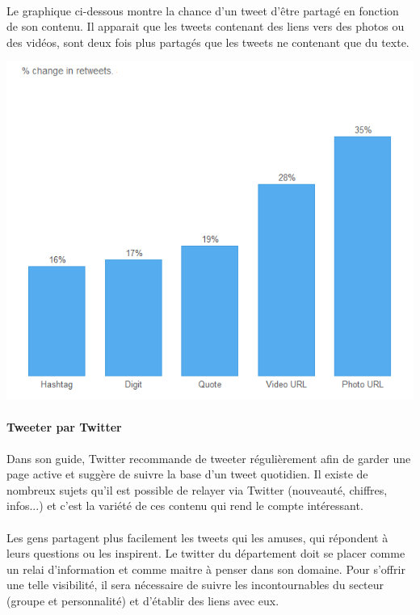 \paragraph{}
Le graphique ci-dessous montre la chance d'un tweet d'être partagé en fonction de son contenu. Il apparait que les tweets contenant des liens vers des photos ou des vidéos, sont deux fois plus partagés que les tweets ne contenant que du texte.
\begin{center}
\includegraphics[scale=0.5]{./image/retweet.png}
\end{center}

\paragraph{Tweeter par Twitter ~~\\} 
Dans son guide, Twitter recommande de tweeter régulièrement afin de garder une page active et suggère de suivre la base d'un tweet quotidien.
Il existe de nombreux sujets qu'il est possible de relayer via Twitter (nouveauté, chiffres, infos...) et c'est la variété de ces contenu qui rend le compte intéressant.
\paragraph{}
 Les gens partagent plus facilement les tweets qui les amuses, qui répondent à leurs questions ou les inspirent. Le twitter du département doit se placer comme un relai d'information et comme maitre à penser dans son domaine. Pour s'offrir une telle visibilité, il sera nécessaire de suivre les incontournables du secteur (groupe et personnalité) et d'établir des liens avec eux.
